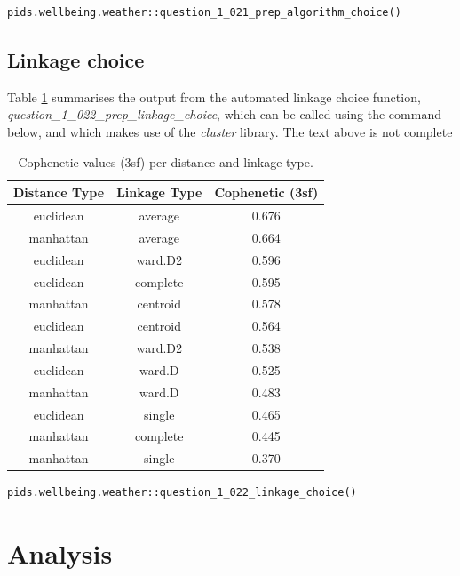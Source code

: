 \documentclass[12pt, oneside, openany]{book}
\begin{document}
\bigskip
\begin{lstlisting}
pids.wellbeing.weather::question_1_021_prep_algorithm_choice()
\end{lstlisting}

\subsection*{Linkage choice}
Table \ref{table:question_1_022_prep_linkage_choice} summarises the output from the automated linkage choice function, \emph{question\_1\_022\_prep\_linkage\_choice}, which can be called using the command below, and which makes use of the \emph{cluster} library.
\color{red}The text above is not complete\color{black}

\begin{table}[h!]
	\centering
	\begin{tabular}{ |c|c|c| }
		\hline
		Distance Type & Linkage Type & Cophenetic (3sf) \\
		\hline
		\hline
		 euclidean  &  average   &  0.676 \\
		manhattan  &  average  & 0.664 \\
		euclidean & ward.D2  & 0.596 \\
		euclidean  & complete   & 0.595 \\		
		 manhattan  & centroid  & 0.578 \\
		euclidean  & centroid  & 0.564 \\
		 manhattan & ward.D2  & 0.538 \\
		euclidean  & ward.D   & 0.525 \\		
		manhattan  & ward.D   & 0.483 \\
		euclidean  & single  & 0.465 \\
		manhattan & complete  & 0.445 \\
		manhattan  & single   & 0.370 \\
		\hline
	\end{tabular}
	\caption{Cophenetic values (3sf) per distance and linkage type.}
	\label{table:question_1_022_prep_linkage_choice}
\end{table}

\bigskip
\begin{lstlisting}
pids.wellbeing.weather::question_1_022_linkage_choice()
\end{lstlisting}

\section*{Analysis}
\end{document}
